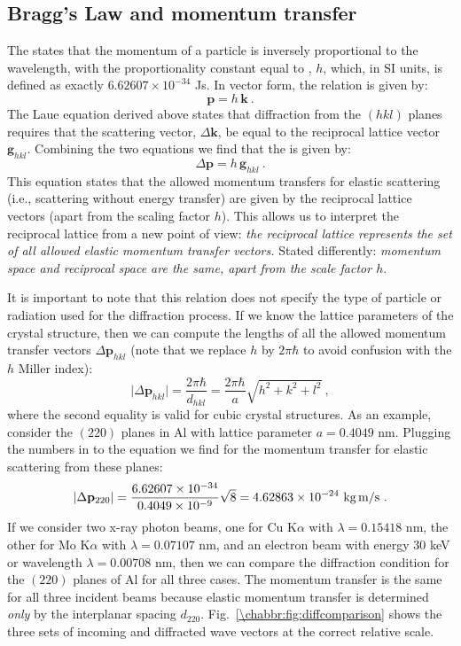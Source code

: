 \subsection{Bragg's Law and momentum transfer}\label{\chabbr:ssec:Braggmomentum}
The  states that the momentum of a particle is inversely proportional to the wavelength, with the proportionality constant equal to , $h$, which, in SI units, is defined as exactly $6.62607\times 10^{-34}$ Js.  In vector form, the relation is given by:
\[
	\mathbf{p} = h\,\mathbf{k}\ . 
\]
The Laue equation derived above states that diffraction from the $(hkl)$ planes requires that the scattering vector, $\Delta\mathbf{k}$, be equal to the reciprocal lattice vector $\mathbf{g}_{hkl}$. Combining the two equations we find that the  is given by:
\begin{equation}
	\Delta\mathbf{p} = h\,\mathbf{g}_{hkl}\ .\label{\chabbr:eq:momentumtransfer}
\end{equation}
This equation states that the allowed momentum transfers for elastic scattering (i.e., scattering without energy transfer) are given by the reciprocal lattice vectors (apart from the scaling factor $h$).  This allows us to interpret the reciprocal lattice from a new point of view: \textit{the reciprocal lattice represents the set of all allowed elastic momentum transfer vectors.} Stated differently: \textit{momentum space and reciprocal space are the same, apart from the scale factor $h$}.

It is important to note that this relation does not specify the type of particle or radiation used for the diffraction process. If we know the lattice parameters of the crystal structure, then we can compute the lengths of all the allowed momentum transfer vectors $\Delta\mathbf{p}_{hkl}$ (note that we replace $h$ by $2\pi\hbar$ to avoid confusion with the $h$ Miller index):
\begin{equation}
	\vert\Delta\mathbf{p}_{hkl}\vert = \frac{2\pi\hbar}{d_{hkl}}=\frac{2\pi\hbar}{a}\sqrt{h^2+k^2+l^2}\ ,\label{\chabbr:eq:momentumtransfer2}
\end{equation}
where the second equality is valid for cubic crystal structures.  As an example, consider the $(220)$ planes in Al with lattice parameter $a=0.4049$ nm.  Plugging the numbers in to the equation we find for the momentum transfer for elastic scattering from these planes:
\[
	\vert\Delta\mathbf{p}_{220}\vert = \frac{6.62607\times 10^{-34}}{0.4049\times 10^{-9}}\sqrt{8} = 4.62863\times 10^{-24}\text{ kg\,m/s}\ .
\]
If we consider two x-ray photon beams, one for Cu K$\alpha$ with $\lambda=0.15418$ nm, the other for Mo K$\alpha$ with $\lambda=0.07107$ nm, and an electron beam with energy $30$ keV or wavelength $\lambda=0.00708$ nm, then we can compare the diffraction condition for the $(220)$ planes of Al for all three cases. The momentum transfer is the same for all three incident beams because elastic momentum transfer is determined \textit{only} by the interplanar spacing $d_{220}$.  Fig.~\ref{\chabbr:fig:diffcomparison} shows the three sets of incoming and diffracted wave vectors at the correct relative scale. 

